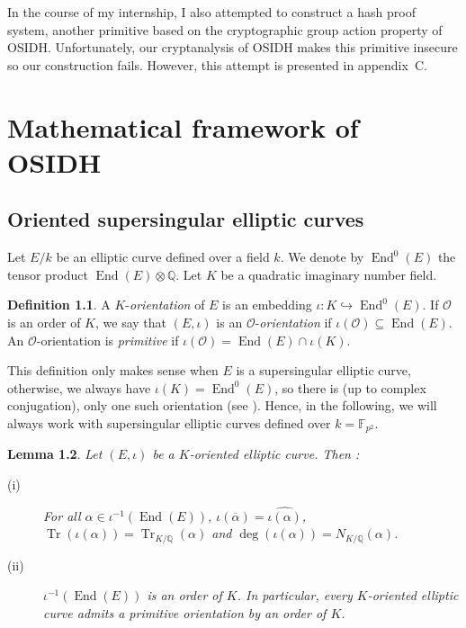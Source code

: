 \documentclass[a4paper,10pt]{report}
\theoremstyle{definition}
\newtheorem{Definition}{Definition}[chapter]
\theoremstyle{plain}
\newtheorem{Lemma}[Definition]{Lemma}
\theoremstyle{definition}
\newcommand{\Q}{\mathbb{Q}}
\newcommand{\F}{\mathbb{F}}
\newcommand{\mO}{\mathcal{O}}
\renewcommand{\(}{\left(}
\renewcommand{\)}{\right)}
\DeclareMathOperator{\End}{End}
\DeclareMathOperator{\Tr}{Tr}
\begin{document}
In the course of my internship, I also attempted to construct a hash proof system, another primitive based on the cryptographic group action property of OSIDH. Unfortunately, our cryptanalysis of OSIDH makes this primitive insecure so our construction fails. However, this attempt is presented in appendix~C.

\chapter{Mathematical framework of OSIDH}

\section{Oriented supersingular elliptic curves}

Let $E/k$ be an elliptic curve defined over a field $k$.  We denote by $\End^0(E)$ the tensor product $\End(E)\otimes \Q$.  Let $K$ be a quadratic imaginary number field.

\begin{Definition}
A $K$-\emph{orientation} of $E$ is an embedding $\iota : K\hookrightarrow \End^0(E)$.  If $\mO$ is an order of $K$,  we say that $(E, \iota)$ is an $\mO$-\emph{orientation} if $\iota(\mO)\subseteq \End(E)$.  An $\mO$-orientation is \emph{primitive} if $\iota(\mO)=\End(E)\cap\iota(K)$.
\end{Definition}

This definition only makes sense when $E$ is a supersingular elliptic curve, otherwise, we always have $\iota(K)=\End^0(E)$, so there is (up to complex conjugation), only one such orientation (see \cite[Corollary III.9.4 and Theorem V.3.1]{Silverman1}). Hence, in the following, we will always work with supersingular elliptic curves defined over $k=\F_{p^2}$.

\begin{Lemma}
Let $(E,\iota)$ be a $K$-oriented elliptic curve.  Then :
\begin{description}
\item[(i)] For all $\alpha\in\iota^{-1}(\End(E))$,  $\iota(\overline{\alpha})=\widehat{\iota(\alpha)}$,  $\Tr(\iota(\alpha))=\Tr_{K/\Q}(\alpha)$ and $\deg(\iota(\alpha))=N_{K/\Q}(\alpha)$.
\item[(ii)] $\iota^{-1}(\End(E))$ is an order of $K$.  In particular,  every $K$-oriented elliptic curve admits a primitive orientation by an order of $K$.
\end{description}
\end{Lemma}
\end{document}
